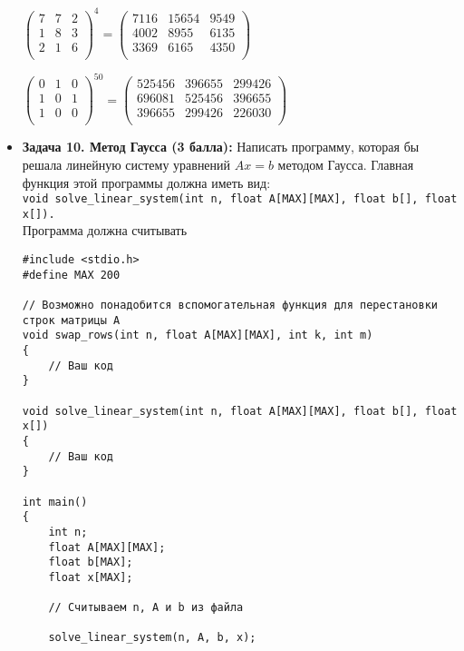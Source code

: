 \documentclass{article}
\begin{document}
\begin{itemize}
\begin{center}
$
\begin{pmatrix}
7 & 7 & 2 \\
1 & 8 & 3 \\
2 & 1 & 6 \\
\end{pmatrix}^4 = 
\begin{pmatrix}
7116 & 15654 & 9549 \\
4002 & 8955 & 6135 \\
3369 & 6165 & 4350 \\
\end{pmatrix}
$
\end{center}

\begin{center}
$
\begin{pmatrix}
0 & 1 & 0 \\
1 & 0 & 1 \\
1 & 0 & 0 \\
\end{pmatrix}^{50} = 
\begin{pmatrix}
525456 & 396655 & 299426 \\
696081 & 525456 & 396655 \\
396655 & 299426 & 226030 \\
\end{pmatrix}
$
\end{center}
\item \textbf{Задача 10. Метод Гаусса (3 балла):} 
Написать программу, которая бы решала линейную систему уравнений $Ax = b$ методом Гаусса. Главная функция этой программы должна иметь вид: \\ \texttt{void solve\_linear\_system(int n, float A[MAX][MAX], float b[], float x[]).} \\
Программа должна считывать 
\begin{lstlisting}
#include <stdio.h>
#define MAX 200

// Возможно понадобится вспомогательная функция для перестановки строк матрицы A
void swap_rows(int n, float A[MAX][MAX], int k, int m)
{
    // Ваш код
}

void solve_linear_system(int n, float A[MAX][MAX], float b[], float x[])
{
    // Ваш код
}

int main()
{
    int n;
    float A[MAX][MAX];
    float b[MAX];
    float x[MAX];
    
    // Считываем n, A и b из файла
	
    solve_linear_system(n, A, b, x);
    

\end{lstlisting}
\end{itemize}
\end{document}
